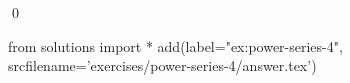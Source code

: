 \begin{ex}
  \label{ex:power-series-4}
  
  \qed
\end{ex}
\begin{python0}
from solutions import *
add(label="ex:power-series-4",
    srcfilename='exercises/power-series-4/answer.tex') 
\end{python0}                              
